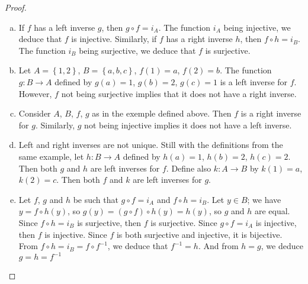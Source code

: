 \documentclass[11pt,a4paper,twoside]{article}
\theoremstyle{definition}
\begin{document}
\begin{proof}\hfill
  \begin{enumerate}[(a)]

  \item If $f$ has a left inverse $g$, then $g \circ f = i_A$. The function $i_A$ being injective, we deduce that $f$ is injective.
    Similarly, if $f$ has a right inverse $h$, then $f \circ h = i_B$. The function $i_B$ being surjective, we deduce that $f$ is surjective.

  \item Let $A = \left\{ 1, 2 \right\}$, $B = \left\{ a, b, c \right\}$, $f (1) = a$, $f (2) = b$. The function $g : B \to A$ defined by
    $g (a) = 1$, $g (b) = 2$, $g (c) = 1$ is a left inverse for $f$. However, $f$ not being surjective implies that it does not have a right inverse.

  \item Consider $A$, $B$, $f$, $g$ as in the exemple defined above. Then $f$ is a right inverse for $g$. Similarly, $g$ not being injective implies it does not have a left inverse.

  \item Left and right inverses are not unique. Still with the definitions from the same example, let $h : B \to A$ defined by $h (a) = 1$, $h (b) = 2$, $h (c) = 2$.
    Then both $g$ and $h$ are left inverses for $f$. Define also $k : A \to B$ by $k (1) = a$, $k (2) = c$. Then both $f$ and $k$ are left inverses for $g$.

  \item Let $f$, $g$ and $h$ be such that $g \circ f = i_A$ and $f \circ h = i_B$.
    Let $y \in B$; we have $y = f \circ h (y)$, so $g (y) = \left( g \circ f \right) \circ h (y) = h (y)$, so $g$ and $h$ are equal.
    Since $f \circ h = i_B$ is surjective, then $f$ is surjective. Since $g \circ f = i_A$ is injective, then $f$ is injective.
    Since $f$ is both surjective and injective, it is bijective. From $f \circ h = i_B = f \circ f^{-1}$, we deduce that $f^{-1} = h$.
    And from $h = g$, we deduce $g = h = f^{-1}$\qedhere

  \end{enumerate}

\end{proof}
\end{document}

